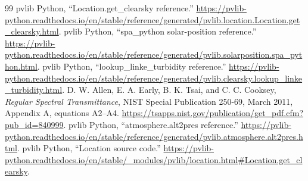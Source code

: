 \documentclass[11pt,a4paper]{article}
\begin{document}
\begin{thebibliography}{99}
 pvlib Python, ``Location.get\_clearsky reference.'' \url{https://pvlib-python.readthedocs.io/en/stable/reference/generated/pvlib.location.Location.get_clearsky.html}.
 pvlib Python, ``spa\_python solar-position reference.'' \url{https://pvlib-python.readthedocs.io/en/stable/reference/generated/pvlib.solarposition.spa_python.html}.
 pvlib Python, ``lookup\_linke\_turbidity reference.'' \url{https://pvlib-python.readthedocs.io/en/stable/reference/generated/pvlib.clearsky.lookup_linke_turbidity.html}.
 D. W. Allen, E. A. Early, B. K. Tsai, and C. C. Cooksey, \emph{Regular Spectral Transmittance}, NIST Special Publication 250-69, March 2011, Appendix A, equations A2--A4. \url{https://tsapps.nist.gov/publication/get_pdf.cfm?pub_id=840999}.
 pvlib Python, ``atmosphere.alt2pres reference.'' \url{https://pvlib-python.readthedocs.io/en/stable/reference/generated/pvlib.atmosphere.alt2pres.html}.
 pvlib Python, ``Location source code.'' \url{https://pvlib-python.readthedocs.io/en/stable/_modules/pvlib/location.html#Location.get_clearsky}.
\end{thebibliography}
\end{document}

